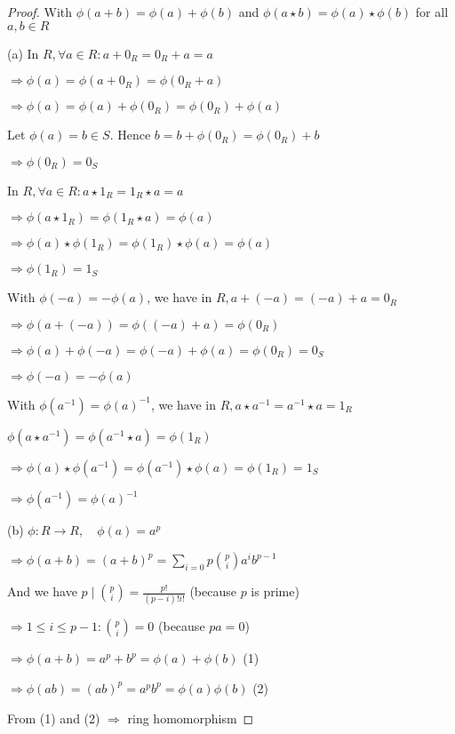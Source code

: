 \begin{proof}
With $\phi(a+b)=\phi(a)+\phi(b)$ and $\phi(a \star b) = \phi(a) \star \phi(b)$ for all $a, b \in R$

(a) In $R, \forall a \in R: a+0_R=0_R+a=a$ 

$\Rightarrow \phi(a)=\phi(a+0_R)=\phi(0_R+a)$

$\Rightarrow \phi(a)=\phi(a)+\phi(0_R)=\phi(0_R)+\phi(a)$

Let $\phi(a)=b \in S$. Hence $b=b+\phi(0_R)=\phi(0_R)+b$

$\Rightarrow \phi(0_R)=0_S$

In $R, \forall a \in R: a \star 1_R = 1_R \star a = a$

$\Rightarrow \phi(a \star 1_R) = \phi(1_R \star a) = \phi(a)$

$\Rightarrow \phi(a) \star \phi(1_R) = \phi(1_R) \star \phi(a) = \phi(a)$

$\Rightarrow \phi(1_R) = 1_S$

With $\phi(-a) = -\phi(a)$, we have in $R, a + (-a) = (-a) + a = 0_R$

$\Rightarrow \phi(a+(-a))=\phi((-a)+a)=\phi(0_R)$

$\Rightarrow \phi(a)+\phi(-a)=\phi(-a)+\phi(a)=\phi(0_R)=0_S$

$\Rightarrow \phi(-a) = -\phi(a)$

With $\phi(a^{-1}) = \phi(a)^{-1}$, we have in $R, a \star a^{-1} = a^{-1} \star a = 1_R$

$\phi(a \star a^{-1}) = \phi(a^{-1} \star a) = \phi(1_R)$

$\Rightarrow \phi(a) \star \phi(a^{-1}) = \phi(a^{-1}) \star \phi(a) = \phi(1_R) = 1_S$

$\Rightarrow \phi(a^{-1})=\phi(a)^{-1}$

(b) $\phi: R \rightarrow R, \quad \phi(a)=a^p$

$\Rightarrow \phi(a+b)=(a+b)^p=\sum_{i=0}{p} \binom{p}{i} a^i b^{p-1}$

And we have $p \mid \binom{p}{i} = \frac{p!}{(p-i)!i!}$ (because $p$ is prime)

$\Rightarrow 1 \leq i \leq p-1: \binom{p}{i} = 0$ (because $pa=0$)

$\Rightarrow \phi(a+b)=a^p+b^p=\phi(a)+\phi(b)$ (1)

$\Rightarrow \phi(ab)=(ab)^p=a^p b^p = \phi(a) \phi(b)$ (2)

From (1) and (2) $\Rightarrow$ ring homomorphism

\end{proof}

